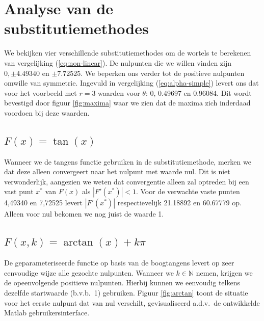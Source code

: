\documentclass[12pt,a4paper]{article}
\begin{document}
\section{Analyse van de substitutiemethodes}

We bekijken vier verschillende substitutiemethodes om de wortels te berekenen van vergelijking (\ref{eq:non-linear}). De nulpunten die we willen vinden zijn $0, \pm4.49340$ en $\pm7.72525$. We beperken ons verder tot de positieve nulpunten omwille van symmetrie. Ingevuld in vergelijking (\ref{eq:alpha-simple}) levert ons dat voor het voorbeeld met $r=3$ waarden voor $\theta$: 0, 0.49697 en 0.96084. Dit wordt bevestigd door figuur \ref{fig:maxima} waar we zien dat de maxima zich inderdaad voordoen bij deze waarden.

\subsection{$F(x) = \tan(x)$}

Wanneer we de tangens functie gebruiken in de substitutiemethode, merken we dat deze alleen convergeert naar het nulpunt met waarde nul. Dit is niet verwonderlijk, aangezien we weten dat convergentie alleen zal optreden bij een vast punt $x^*$ van $F(x)$ als $|F'(x^*)| < 1$. Voor de verwachte vaste punten 4,49340 en 7,72525 levert $|F'(x^*)|$ respectievelijk 21.18892 en 60.67779 op. Alleen voor nul bekomen we nog juist de waarde 1.

\subsection{$F(x,k) = \arctan(x) + k\pi$}

De geparameteriseerde functie op basis van de boogtangens levert op zeer eenvoudige wijze alle gezochte nulpunten. Wanneer we $k \in \mathbb{N}$ nemen, krijgen we de opeenvolgende positieve nulpunten. Hierbij kunnen we eenvoudig telkens dezelfde startwaarde (b.v.b.\ 1) gebruiken. Figuur \ref{fig:arctan} toont de situatie voor het eerste nulpunt dat van nul verschilt, gevisualiseerd a.d.v.\ de ontwikkelde Matlab gebruikersinterface.
\end{document}
